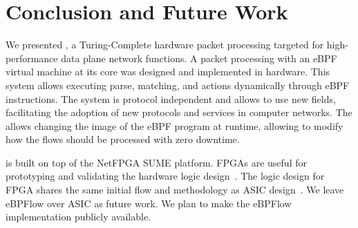 \section{Conclusion and Future Work}
\label{sec:conclusion}

We presented \system, a Turing-Complete hardware packet processing targeted for high-performance data plane network functions.
A packet processing with an eBPF virtual machine at its core was designed and implemented in hardware. 
This system allows executing parse, matching, and actions dynamically through eBPF instructions.
The system is protocol independent and allows to use new fields, facilitating the adoption of new protocols and services in computer networks.
The \system allows changing the image of the eBPF program at runtime, allowing to modify how the flows should be processed with zero downtime.


\system is built on top of the NetFPGA SUME platform.
FPGAs are useful for prototyping and validating the hardware logic design~\cite{cofer2005rapid,sukhwani2017contutto}. 
The logic design for FPGA shares the same initial flow and methodology as ASIC design~\cite{kuon07measuring,ASICDesignFlow2005}. 
We leave eBPFlow over ASIC as future work.
We plan to make the eBPFlow implementation publicly available.
